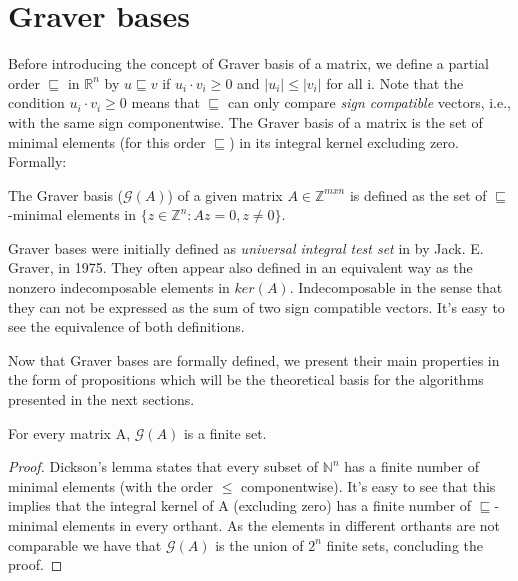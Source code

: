 \chapter{Graver bases} \label{literature}



Before introducing the concept of Graver basis of a matrix, we define a partial order $\sqsubseteq$ in $\mathbb{R}^n$ by $u \sqsubseteq v$ if $u_i \cdot v_i \geq 0$ and $|u_i| \leq |v_i|$ for all i. Note that the condition $u_i \cdot v_i \geq 0$ means that $\sqsubseteq$ can only compare \textit{sign compatible} vectors, i.e., with the same sign componentwise. The Graver basis of a matrix is the set of minimal elements (for this order $\sqsubseteq$) in its integral kernel excluding zero. Formally: 

\begin{definition}
The Graver basis ($\mathcal{G}(A)$) of a given matrix $A \in \mathbb{Z}^{mxn}$ is defined as the set of $\sqsubseteq$-minimal elements in $\{z \in \mathbb{Z}^n: Az = 0, z\neq0\}$.%
\end{definition}

\vspace{-5pt}
Graver bases were initially defined as \textit{universal integral test set} in \cite{GRAVER:1975} by Jack. E. Graver, in 1975. They often appear also defined in an equivalent way as the nonzero indecomposable elements in $ker(A)$. Indecomposable in the sense that they can not be expressed as the sum of two sign compatible vectors. It's easy to see the equivalence of both definitions.

Now that Graver bases are formally defined, we present their main properties in the form of propositions which will be the theoretical basis for the algorithms presented in the next sections.

\begin{proposition}
For every matrix A, $\mathcal{G}(A)$ is a finite set.
\end{proposition}
\vspace{-20pt}
\begin{proof}
Dickson's lemma states that every subset of $\mathbb{N}^n$ has a finite number of minimal elements (with the order $\leq$ componentwise). It's easy to see that this implies that the integral kernel of A (excluding zero) has a finite number of $\sqsubseteq$-minimal elements in every orthant. As the elements in different orthants are not comparable we have that $\mathcal{G}(A)$ is the union of $2^n$ finite sets, concluding the proof.
\end{proof}

